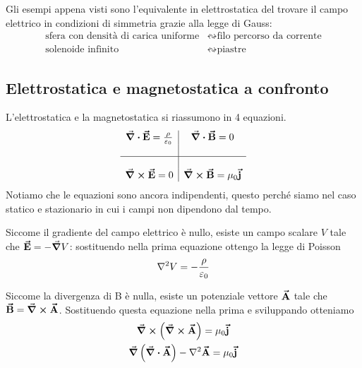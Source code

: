 \begin{observe}
Gli esempi appena visti sono l'equivalente in elettrostatica del trovare il campo elettrico in condizioni di simmetria grazie alla legge di Gauss: 
	\begin{align*}
		\text{sfera con densità di carica uniforme} & \leftrightsquigarrow  \text{filo percorso da corrente}\\
		\text{solenoide infinito} & \leftrightsquigarrow  \text{piastre}
	\end{align*}
\end{observe}

\subsection{Elettrostatica e magnetostatica a confronto}
L'elettrostatica e la magnetostatica si riassumono in 4 equazioni.
\begin{gather*}
	\begin{array}{c|c}
		\div{\vb*{\va{E}}}=\frac{\rho}{\varepsilon_0} & \div{\vb*{\va{B}}}=0\\
		\\
		\hline
		\\
		\curl{\vb*{\va{E}}}=0 & \curl{\vb*{\va{B}}}=\mu_0\vb*{\va{j}}
	\end{array}
\end{gather*}
Notiamo che le equazioni sono ancora indipendenti, questo perché siamo nel caso statico e stazionario in cui i campi non dipendono dal tempo.


Siccome il gradiente del campo elettrico è nullo, esiste un campo scalare $V$ tale che $\vb*{\va{E}}=-\grad V$: sostituendo nella prima equazione ottengo la legge di Poisson   
\begin{equation*}
	\laplacian V=-\frac{\rho}{\epsilon_0}
\end{equation*}


Siccome la divergenza di B è nulla, esiste un potenziale vettore $\vb*{\va{A}}$ tale che $\vb*{\va{B}}=\curl{\vb*{\va{A}}}$. Sostituendo questa equazione nella prima e sviluppando otteniamo
\begin{gather*}
	\curl\left(\curl\vba A\right)=\mu_0\vba j\\
	\grad \left( \div{\vba A}\right) - \laplacian{\vba A}=\mu_0 \vba j
\end{gather*}

